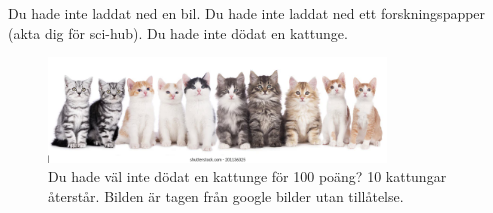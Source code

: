 \noindent

Du hade inte laddat ned en bil. Du hade inte laddat ned ett forskningspapper (akta dig för sci-hub). Du hade inte dödat en kattunge.

\begin{centering}
    \begin{figure}[h]
        \centering
        \includegraphics[width=0.8\textwidth]{10.png}
        \caption{Du hade väl inte dödat en kattunge för 100 poäng? 10 kattungar återstår. Bilden är tagen från google bilder utan tillåtelse.}
    \end{figure}
\end{centering}

